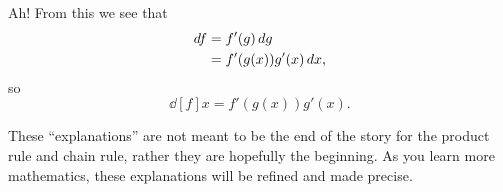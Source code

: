 \documentclass{ximera}
\begin{document}
\begin{theorem}
\begin{explanation}
\begin{image}
  \end{image}
  Ah! From this we see that
  \begin{align*}
    \mathop{}\!d f &= f'(g) \mathop{}\!d g\\
    &= f'(g(x)) g'(x) \mathop{}\!d x,
  \end{align*}
  so
  \[
  \dd[f]{x} = f'(g(x))g'(x).
  \]
\end{explanation}
\end{theorem}


These ``explanations'' are not meant to be the end of the story for
the product rule and chain rule, rather they are hopefully the
beginning. As you learn more mathematics, these explanations will be
refined and made precise.



\end{document}
